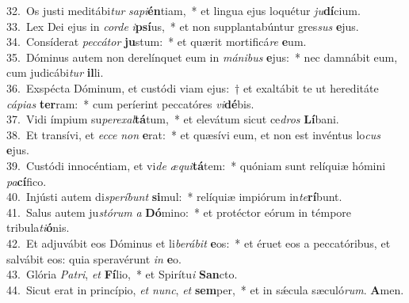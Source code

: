 {32.~}Os justi meditábi\textit{tur} \textit{sa}\textit{pi}\textbf{én}tiam,~* et lingua ejus loquétur \textit{ju}\textbf{dí}cium.\\
{33.~}Lex Dei ejus in \textit{cor}\textit{de} \textit{i}\textbf{psí}us,~* et non supplantabúntur gres\textit{sus} \textbf{e}jus.\\
{34.~}Consíderat \textit{pec}\textit{cá}\textit{tor} \textbf{ju}stum:~* et quærit mortificá\textit{re} \textbf{e}um.\\
{35.~}Dóminus autem non derelínquet eum in \textit{má}\textit{ni}\textit{bus} \textbf{e}jus:~* nec damnábit eum, cum judicábi\textit{tur} \textbf{il}li.\\
{36.~}Exspécta Dóminum, et custódi viam ejus:~† et exaltábit te ut hereditáte \textit{cá}\textit{pi}\textit{as} \textbf{ter}ram:~* cum períerint peccatóres \textit{vi}\textbf{dé}bis.\\
{37.~}Vidi ímpium su\textit{pe}\textit{re}\textit{xal}\textbf{tá}tum,~* et elevátum sicut ce\textit{dros} \textbf{Lí}bani.\\
{38.~}Et transívi, et \textit{ec}\textit{ce} \textit{non} \textbf{e}rat:~* et quæsívi eum, et non est invéntus lo\textit{cus} \textbf{e}jus.\\
{39.~}Custódi innocéntiam, et vi\textit{de} \textit{æ}\textit{qui}\textbf{tá}tem:~* quóniam sunt relíquiæ hómini \textit{pa}\textbf{cí}fico.\\
{40.~}Injústi autem di\textit{spe}\textit{rí}\textit{bunt} \textbf{si}mul:~* relíquiæ impiórum in\textit{te}\textbf{rí}bunt.\\
{41.~}Salus autem ju\textit{stó}\textit{rum} \textit{a} \textbf{Dó}mino:~* et protéctor eórum in témpore tribula\textit{ti}\textbf{ó}nis.\\
{42.~}Et adjuvábit eos Dóminus et li\textit{be}\textit{rá}\textit{bit} \textbf{e}os:~* et éruet eos a peccatóribus, et salvábit eos: quia speravérunt \textit{in} \textbf{e}o.\\
{43.~}Glória \textit{Pa}\textit{tri}, \textit{et} \textbf{Fí}lio,~* et Spirítu\textit{i} \textbf{San}cto.\\
{44.~}Sicut erat in princípio, \textit{et} \textit{nunc}, \textit{et} \textbf{sem}per,~* et in sǽcula sæculó\textit{rum}. \textbf{A}men.\\
